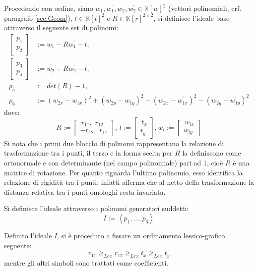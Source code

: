 Procedendo con ordine, siano $w_1, w_1^{'}, w_2, w_2^{'} \in \mathbb{K}[w]^2$ (vettori polinomiali, crf. paragrafo \ref{sec:Geom}),  $t \in \mathbb{K}[t]^2$ e $R \in \mathbb{K}[r]^{2 \times 2}$, si definisce l'ideale base attraverso il seguente set di polinomi:
\begin{align}
	\begin{bmatrix}p_1 \\ p_2 \end{bmatrix} &:= w_1 - Rw_1^{'} - t,\\
	\begin{bmatrix}p_3 \\ p_4 \end{bmatrix} &:= w_2 - Rw_2^{'} - t, \\
	p_5 &:= det(R) - 1,\\
	p_{6} &:= (w_{2x} - w_{1x})^2 + (w_{2y} - w_{1y})^2 - (w_{2x}^{'} - w_{1x}^{'})^2 - (w_{2y}^{'} - w_{1y}^{'})^2
\end{align}
dove: 
\begin{equation}
	R := \begin{bmatrix}
	\,r_{11}, \,\, r_{12} \\
	-r_{12}, \,\, r_{11}
	\end{bmatrix}, \, t := \begin{bmatrix}	\,t_x \\ t_y\end{bmatrix}, w_i := \begin{bmatrix}	\,w_{ix} \\ w_{iy}\end{bmatrix}
\end{equation}
Si nota che i primi due blocchi di polinomi rappresentano la relazione di trasformazione tra i punti, il terzo e la forma scelta per $R$ la definiscono come ortonormale e con determinante (nel campo polinomiale) pari ad 1, cioè $R$ è una matrice di rotazione. Per quanto riguarda l'ultimo polinomio, esso identifica la relazione di rigidità tra i punti; infatti afferma che al netto della trasformazione la distanza relativa tra i punti omologhi resta invariata.

Si definisce l'ideale attraverso i polinomi generatori suddetti:
\begin{equation}
	I := \left\langle p_1, \dots, p_{6}\right\rangle 
\end{equation}

Definito l'ideale $I$, si è proceduto a fissare un ordinamento lessico-grafico seguente:
\begin{equation}
	r_{11} \ge_{Lex} r_{12} \ge_{Lex} t_x \ge_{Lex} t_y
\end{equation}
mentre gli altri simboli sono trattati come coefficienti.

